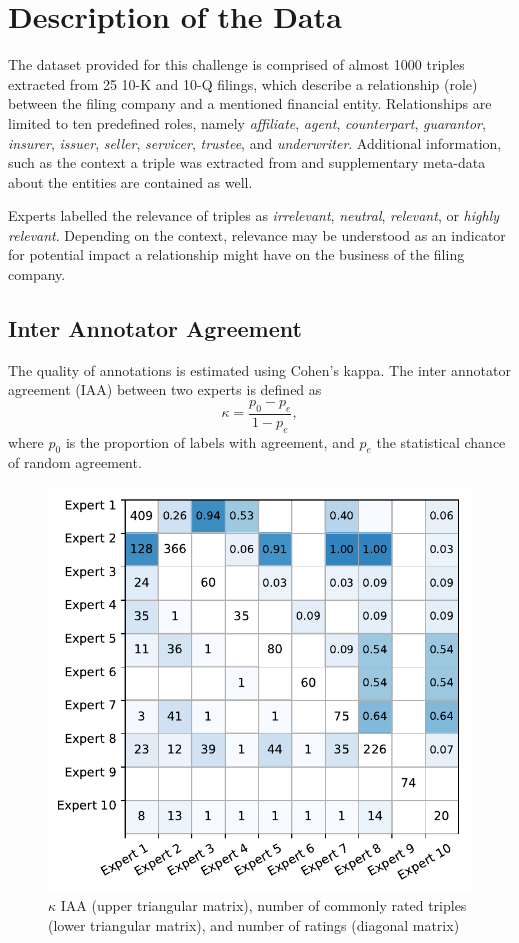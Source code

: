 \section{Description of the Data}
The dataset provided for this challenge is comprised of almost 1000 triples extracted from 25 10-K and 10-Q filings, which describe a relationship (role) between the filing company and a mentioned financial entity.
Relationships are limited to ten predefined roles, namely \textit{affiliate}, \textit{agent}, \textit{counterpart}, \textit{guarantor}, \textit{insurer}, \textit{issuer}, \textit{seller}, \textit{servicer}, \textit{trustee}, and \textit{underwriter}.
Additional information, such as the context a triple was extracted from and supplementary meta-data about the entities are contained as well.

Experts labelled the relevance of triples as \textit{irrelevant}, \textit{neutral}, \textit{relevant}, or \textit{highly relevant}.
Depending on the context, relevance may be understood as an indicator for potential impact a relationship might have on the business of the filing company. 


\subsection{Inter Annotator Agreement}
The quality of annotations is estimated using Cohen's kappa. The inter annotator agreement (IAA) between two experts is defined as
$$
\kappa = \frac{p_0-p_e}{1-p_e},
$$
where $p_0$ is the proportion of labels with agreement, and $p_e$ the statistical chance of random agreement.

\begin{figure}
	\includegraphics[width=0.7\linewidth]{iaa}
	\caption{$\kappa$ IAA (upper triangular matrix), number of commonly rated triples (lower triangular matrix), and number of ratings (diagonal matrix)}
	\label{fig:iaa}
\end{figure}


